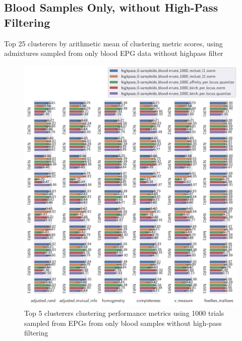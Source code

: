 \begin{theappendices}
\subsection{Blood Samples Only, without High-Pass Filtering}

\begin{table}[H]
\centering
{}
\caption{Top 25 clusterers by arithmetic mean of clustering metric scores, using admixtures sampled from only blood EPG data without highpass filter}
\label{table:top_25_not_ensemble_clusterers_by_metrics_highpass_0-sampleids_blood-nruns_1000}
\end{table}

\begin{figure}[H]
\centering
\includegraphics[width=\textwidth]{./figures/clust_comparison/highpass_0-sampleids_blood-nruns_1000_top_5_clusterers_by_metrics.pdf}
\caption{Top 5 clusterers clustering performance metrics using 1000 trials sampled from EPGs from only blood samples without high-pass filtering}
\label{fig:highpass_0-sampleids_blood-nruns_1000_top_5_clusterers_by_metrics}
\end{figure}


\end{theappendices}

